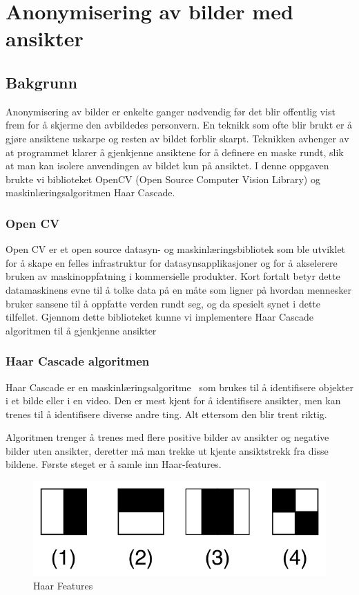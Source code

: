 \newpage
\section{Anonymisering av bilder med ansikter}
\label{sec:Anonymisering}
\subsection{Bakgrunn}
Anonymisering av bilder er enkelte ganger nødvendig før det blir offentlig vist frem for å skjerme den avbildedes personvern. En teknikk som ofte blir brukt er å gjøre ansiktene uskarpe og resten av bildet forblir skarpt. Teknikken avhenger av at programmet klarer å gjenkjenne ansiktene\cite{wiki:FaceDetection} for å definere en maske rundt, slik at man kan isolere anvendingen av bildet kun på ansiktet. I denne oppgaven brukte vi biblioteket OpenCV (Open Source Computer Vision Library) og maskinlæringsalgoritmen Haar Cascade. 

\subsubsection{Open CV}
Open CV er et open source datasyn-\cite{datasyn} og maskinlæringsbibliotek som ble utviklet for å skape en felles infrastruktur for datasynsapplikasjoner og for å akselerere bruken av maskinoppfatning i kommersielle produkter\cite{cv2}. Kort fortalt betyr dette datamaskinens evne til å tolke data på en måte som ligner på hvordan mennesker bruker sansene til å oppfatte verden rundt seg, og da spesielt synet i dette tilfellet. Gjennom dette biblioteket kunne vi implementere Haar Cascade algoritmen til å gjenkjenne ansikter

\subsubsection{Haar Cascade algoritmen}
Haar Cascade er en maskinlæringsalgoritme~\cite{haar} som brukes til å identifisere objekter i et bilde eller i en video. Den er mest kjent for å identifisere ansikter, men kan trenes til å identifisere diverse andre ting. Alt ettersom den blir trent riktig.

Algoritmen trenger å trenes med flere positive bilder av ansikter og negative bilder uten ansikter, deretter må man trekke ut kjente ansiktstrekk fra disse bildene. Første steget er å samle inn Haar-features. 

\begin{figure}[H]
\begin{center}
    \includegraphics[width=0.4\columnwidth]{bilder/Anonymisering/VJ_featureTypes.svg.png}
     \caption{Haar Features\label{fig:haarfeat}} 
\end{center}
\end{figure}

